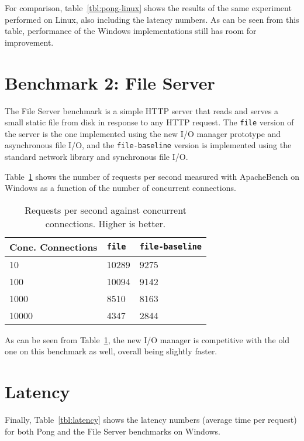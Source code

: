 \documentclass[a4paper,11pt,oneside]{report}
\begin{document}
For comparison, table~\ref{tbl:pong-linux} shows the results of the same
experiment performed on Linux, also including the latency numbers. As can be
seen from this table, performance of the Windows implementations still has room
for improvement.

\section{Benchmark 2: File Server}

The File Server benchmark is a simple HTTP server that reads and serves a small
static file from disk in response to any HTTP request. The \texttt{file} version
of the server is the one implemented using the new I/O manager prototype and
asynchronous file I/O, and the \texttt{file-baseline} version is implemented
using the standard network library and synchronous file I/O.

Table~\ref{tbl:file} shows the number of requests per second measured with
ApacheBench on Windows as a function of the number of concurrent connections.

\begin{table}[h!]
\centering
\begin{tabular}{ | l | l | l | }
  \hline
  Conc. Connections & \texttt{file} & \texttt{file-baseline} \\
  \hline
  10 & 10289 & 9275 \\
  \hline
  100 & 10094 & 9142 \\
  \hline
  1000 & 8510 & 8163 \\
  \hline
  10000 & 4347 & 2844 \\
  \hline
\end{tabular}
\caption{Requests per second against concurrent connections. Higher is better.}
\label{tbl:file}
\end{table}

As can be seen from Table~\ref{tbl:file}, the new I/O manager is competitive
with the old one on this benchmark as well, overall being slightly faster.

\section{Latency}

Finally, Table~\ref{tbl:latency} shows the latency numbers (average time per
request) for both Pong and the File Server benchmarks on Windows.
\end{document}
